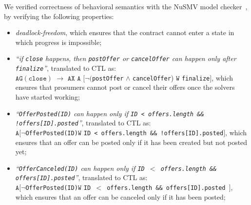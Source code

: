 We verified correctness of behavioral semantics with the NuSMV model checker~\cite{cimatti2002nusmv}, by verifying the following properties:
\begin{itemize}
    \item \emph{deadlock-freedom}, which ensures that the contract cannot enter a state in which progress is impossible;
    \item \emph{``if \texttt{close} happens, then \texttt{postOffer} or \texttt{cancelOffer} can happen only after \texttt{finalize}''}, translated to CTL as:\\ $\mathtt{AG}(\texttt{close})$ $\rightarrow$ $\mathtt{AX}$ $\mathtt{A}$ $[\neg ($\texttt{postOffer} $\wedge$ \texttt{cancelOffer}) $\mathtt{W}$ \texttt{finalize}$]$, which ensures that prosumers cannot post or cancel their offers once the solvers have started working;
    \item \emph{``\texttt{OfferPosted(ID)} can happen only if \texttt{ID < offers.length \&\& !offers[ID].posted}''}, translated to CTL as:\\ $\mathtt{A}[ \neg$\texttt{OfferPosted(ID)}$\mathtt{W}$ \texttt{ID < offers.length \&\& !offers[ID].posted}$]$, which ensures that an offer can be posted only if it has been created but not posted yet;
    \item \emph{``\texttt{OfferCanceled(ID)} can happen only if  \texttt{ID $<$ offers.length \&\&} \texttt{offers[ID].posted}''}, translated to CTL as:\\ $\mathtt{A}[ \neg$\texttt{OfferPosted(ID)}$\mathtt{W}$ \texttt{ID $<$ offers.length \&\& offers[ID].posted   }$]$, which ensures that an offer can be canceled only if it has been posted;

\end{itemize}
